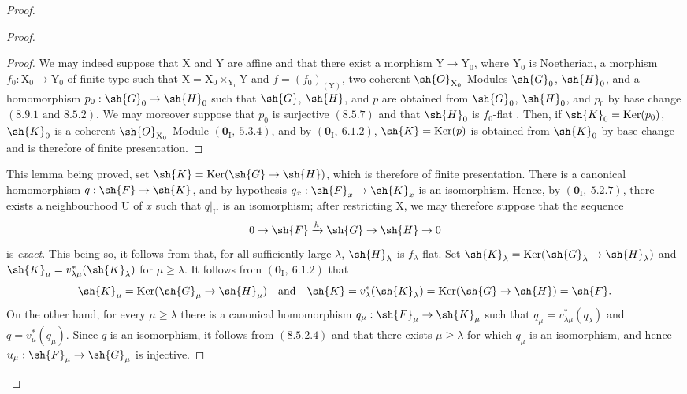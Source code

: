 \begin{proof}
\begin{proof}
\begin{proof}
We may indeed suppose that $\mathrm{X}$ and $\mathrm{Y}$ are affine and that there exist a morphism $\mathrm{Y}\to\mathrm{Y}_0$, where $\mathrm{Y}_0$ is Noetherian, a morphism $f_0:\mathrm{X}_0\to\mathrm{Y}_0$ of finite type such that $\mathrm{X}=\mathrm{X}_0\times_{\mathrm{Y}_0}\mathrm{Y}$ and $f=(f_0)_{(\mathrm{Y})}$, two coherent $\sh{O}_{\mathrm{X}_0}$-Modules $\sh{G}_0$, $\sh{H}_0$, and a homomorphism $p_0:\sh{G}_0\to\sh{H}_0$ such that $\sh{G}$, $\sh{H}$, and $p$ are obtained from $\sh{G}_0$, $\sh{H}_0$, and $p_0$ by base change $(8.9.1\text{ and }8.5.2)$. We may moreover suppose that $p_0$ is surjective $(8.5.7)$ and that $\sh{H}_0$ is $f_0$-flat . Then, if $\sh{K}_0=\operatorname{Ker}(p_0)$, $\sh{K}_0$ is a coherent $\sh{O}_{\mathrm{X}_0}$-Module $(\mathbf{0}_\mathrm{I},~5.3.4)$, and by $(\mathbf{0}_\mathrm{I},~6.1.2)$, $\sh{K}=\operatorname{Ker}(p)$ is obtained from $\sh{K}_0$ by base change and is therefore of finite presentation.
\end{proof}

This lemma being proved, set $\sh{K}=\operatorname{Ker}(\sh{G}\to\sh{H})$, which is therefore of finite presentation. There is a canonical homomorphism $q:\sh{F}\to\sh{K}$, and by hypothesis $q_x:\sh{F}_x\to\sh{K}_x$ is an isomorphism. Hence, by $(\mathbf{0}_\mathrm{I},~5.2.7)$, there exists a neighbourhood $\mathrm{U}$ of $x$ such that $q|_{\mathrm{U}}$ is an isomorphism; after restricting $\mathrm{X}$, we may therefore suppose that the sequence
\[
  0\to\sh{F}\xrightarrow{h}\sh{G}\to\sh{H}\to 0
\]
is \emph{exact}. This being so, it follows from  that, for all sufficiently large $\lambda$, $\sh{H}_\lambda$ is $f_\lambda$-flat. Set $\sh{K}_\lambda=\operatorname{Ker}(\sh{G}_\lambda\to\sh{H}_\lambda)$ and $\sh{K}_\mu=v^*_{\lambda\mu}(\sh{K}_\lambda)$ for $\mu\geqslant\lambda$. It follows from $(\mathbf{0}_\mathrm{I},~6.1.2)$ that
\[
  \sh{K}_\mu=\operatorname{Ker}(\sh{G}_\mu\to\sh{H}_\mu)
  \quad\text{and}\quad
  \sh{K}=v^*_\lambda(\sh{K}_\lambda)
  =\operatorname{Ker}(\sh{G}\to\sh{H})=\sh{F}.
\]
On the other hand, for every $\mu\geqslant\lambda$ there is a canonical homomorphism $q_\mu:\sh{F}_\mu\to\sh{K}_\mu$ such that $q_\mu=v^*_{\lambda\mu}(q_\lambda)$ and $q=v^*_\mu(q_\mu)$. Since $q$ is an isomorphism, it follows from $(8.5.2.4)$ and  that there exists $\mu\geqslant\lambda$ for which $q_\mu$ is an isomorphism, and hence $u_\mu:\sh{F}_\mu\to\sh{G}_\mu$ is injective.
\end{proof}


\end{proof}
